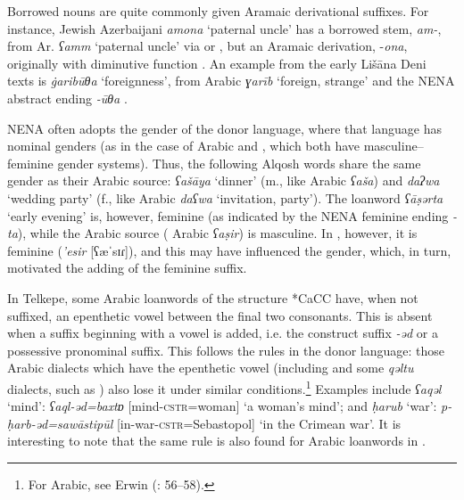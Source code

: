 \documentclass[output=paper]{langsci/langscibook}
\begin{document}
Borrowed nouns are quite commonly given Aramaic {derivational} suffixes. For instance, Jewish Azerbaijani \textit{amona} ‘paternal uncle’ has a borrowed {stem}, \textit{am-}, from Ar. \textit{ʕamm} ‘paternal uncle’ via  or , but an Aramaic {derivation}, \nobreakdash-\textit{ona}, originally with {diminutive} function \citep[165]{Garbell1965}. An example from the early Lišāna Deni texts is \textit{\.garibūθa} ‘foreignness’, from Arabic \textit{ɣarīb} ‘foreign, strange’ and the NENA abstract ending \textit{{}-ūθa} \citep[205]{Sabar1984}.

NENA often adopts the {gender} of the donor language, where that language has nominal genders (as in the case of Arabic and , which both have masculine--feminine {gender} systems). Thus, the following  Alqosh words share the same {gender} as their Arabic source: \textit{ʕašāya} ‘dinner’ (m., like  Arabic \textit{ʕaša}) and \textit{daʔwa} ‘wedding party’ (f., like Arabic \textit{daʕwa} ‘invitation, party’). The {loanword} \textit{ʕāṣərta} ‘early evening’ is, however, feminine (as indicated by the NENA feminine ending \textit{{}-ta}), while the Arabic source ( Arabic \textit{ʕaṣir}) is masculine. In , however, it is feminine (\textit{{}'esir} [ʕæˈsɪɾ]), and this may have influenced the {gender}, which, in turn, motivated the adding of the feminine suffix.

In  Telkepe, some Arabic {loanwords} of the structure *CaCC have, when not suffixed, an epenthetic vowel between the final two consonants. This is absent when a suffix beginning with a vowel is added, i.e. the construct suffix \textit{{}-əd} or a possessive pronominal suffix. This follows the rules in the donor language: those Arabic dialects which have the epenthetic vowel (including  and some \textit{qəltu} dialects, such as ) also lose it under similar conditions.\footnote{For  Arabic, see Erwin (\citeyear{Erwin1963}: 56–58).} Examples include \textit{ʕaqəl} ‘mind’: \textit{ʕaql-əd=baxtɒ} [mind-\textsc{cstr}=woman] ‘a woman's mind'; and \textit{ḥarub} ‘war’: \textit{p\nobreakdash-ḥarb\nobreakdash-əd=sawāstipūl} [in-war-\textsc{cstr}=Sebastopol] ‘in the Crimean war’. It is interesting to note that the same rule is also found for Arabic {loanwords} in  \citep[5]{Thackston2006}.
\end{document}
